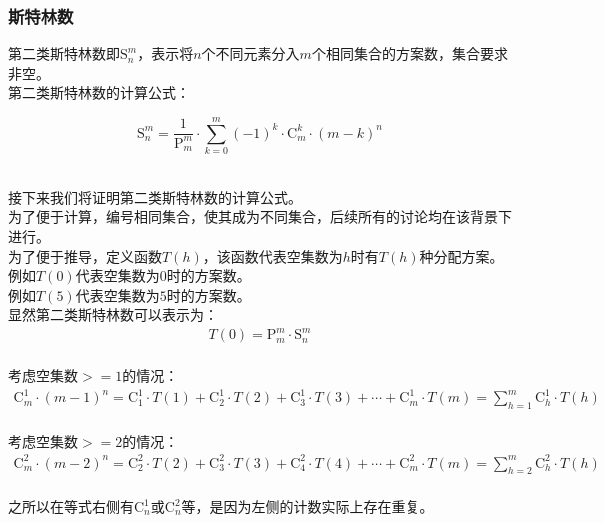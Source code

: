 \documentclass[UTF8]{ctexart}
\begin{document}
\subsubsection{斯特林数}
    第二类斯特林数即$\mathrm{S}_n^m$，表示将$n$个不同元素分入$m$个相同集合的方案数，集合要求非空。\\[3mm]
    第二类斯特林数的计算公式：
    \begin{large}
        \begin{equation*}
            \mathrm{S}_n^m=\frac{1}{\mathrm{P}_m^m}\cdot\sum_{k=0}^{m}(-1)^k\cdot\mathrm{C}_m^k\cdot(m-k)^n
        \end{equation*}
    \end{large}\\
    接下来我们将证明第二类斯特林数的计算公式。\\[3mm]
    为了便于计算，编号相同集合，使其成为不同集合，后续所有的讨论均在该背景下进行。\\[3mm]
    为了便于推导，定义函数$T(h)$，该函数代表空集数为$h$时有$T(h)$种分配方案。\\[3mm]
    例如$T(0)$代表空集数为$0$时的方案数。\\[3mm]
    例如$T(5)$代表空集数为$5$时的方案数。\\[3mm]
    显然第二类斯特林数可以表示为：
    \setcounter{equation}{0}
    \begin{align}
        T(0)=\mathrm{P}_m^m\cdot\mathrm{S}_n^m
    \end{align}\\
    考虑空集数$>=1$的情况：
    \begin{align}
        \mathrm{C}_m^1\cdot(m-1)^n=\mathrm{C}_1^1\cdot T(1)+\mathrm{C}_2^1\cdot T(2)+\mathrm{C}_3^1\cdot T(3)+\cdots+\mathrm{C}_m^1\cdot T(m)=\sum_{h=1}^m\mathrm{C}_h^1\cdot T(h)
    \end{align}\\
    考虑空集数$>=2$的情况：
    \begin{align}
        \mathrm{C}_m^2\cdot(m-2)^n=\mathrm{C}_2^2\cdot T(2)+\mathrm{C}_3^2\cdot T(3)+\mathrm{C}_4^2\cdot T(4)+\cdots+\mathrm{C}_m^2\cdot T(m)=\sum_{h=2}^m\mathrm{C}_h^2\cdot T(h)
    \end{align}\\
    之所以在等式右侧有$\mathrm{C}_n^1$或$\mathrm{C}_n^2$等，是因为左侧的计数实际上存在重复。

\newpage
\end{document}
